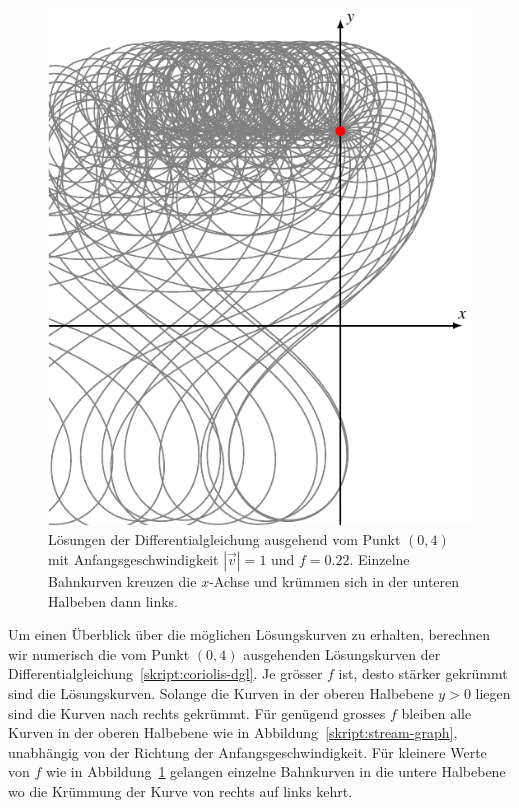 \begin{figure}
\centering
\includegraphics{chapters/1/cross.pdf}
\caption{
Lösungen der Differentialgleichung ausgehend vom Punkt $(0,4)$
mit Anfangsgeschwindigkeit $|\vec{v}|=1$ und $f=0.22$.
Einzelne Bahnkurven kreuzen die $x$-Achse und krümmen sich in der unteren
Halbeben dann links.
\label{skript:cross-graph}}
\end{figure}

Um einen Überblick über die möglichen Lösungskurven zu erhalten, berechnen
wir numerisch die vom Punkt $(0,4)$ ausgehenden Lösungskurven 
der Differentialgleichung~\ref{skript:coriolis-dgl}.
Je grösser $f$ ist, desto stärker gekrümmt sind die Lösungskurven.
Solange die Kurven in der oberen Halbebene $y>0$ liegen sind die Kurven
nach rechts gekrümmt.
Für genügend grosses $f$ bleiben alle Kurven in der oberen
Halbebene wie in Abbildung~\ref{skript:stream-graph}, unabhängig
von der Richtung der Anfangsgeschwindigkeit.
Für kleinere Werte von $f$ wie in Abbildung~\ref{skript:cross-graph}
gelangen einzelne Bahnkurven in die untere Halbebene wo die Krümmung
der Kurve von rechts auf links kehrt.

